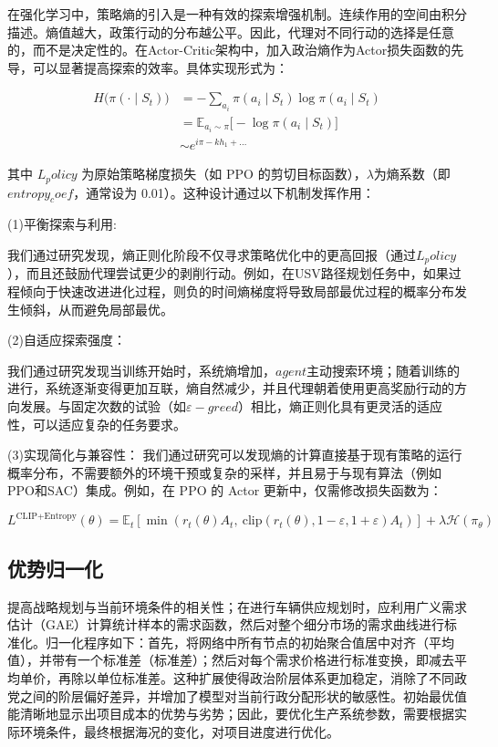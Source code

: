 在强化学习中，策略熵的引入是一种有效的探索增强机制。连续作用的空间由积分描述。熵值越大，政策行动的分布越公平。因此，代理对不同行动的选择是任意的，而不是决定性的。在Actor-Critic架构中，加入政治熵作为Actor损失函数的先导，可以显著提高探索的效率。具体实现形式为：

\begin{align}
	H\big(\pi(\cdot \mid S_t)\big) &= -\sum_{a_i} \pi(a_i \mid S_t) \log \pi(a_i \mid S_t) \\
	&= \mathbb{E}_{a_i \sim \pi} \Big[ -\log \pi(a_i \mid S_t) \Big] \\
	&\sim e^{i\pi - k h_1 + \dots}
\end{align}

其中 \(L_policy\) 为原始策略梯度损失（如 PPO 的剪切目标函数），\(λ\)为熵系数（即 \(entropy_coef\)，通常设为 0.01）。这种设计通过以下机制发挥作用：

(1)平衡探索与利用:

我们通过研究发现，熵正则化阶段不仅寻求策略优化中的更高回报（通过\(L_policy\)），而且还鼓励代理尝试更少的剥削行动。例如，在USV路径规划任务中，如果过程倾向于快速改进进化过程，则负的时间熵梯度将导致局部最优过程的概率分布发生倾斜，从而避免局部最优。

(2)自适应探索强度：

我们通过研究发现当训练开始时，系统熵增加，\(agent\)主动搜索环境；随着训练的进行，系统逐渐变得更加互联，熵自然减少，并且代理朝着使用更高奖励行动的方向发展。与固定次数的试验（如\(ε-greed\)）相比，熵正则化具有更灵活的适应性，可以适应复杂的任务要求。

(3)实现简化与兼容性：
我们通过研究可以发现熵的计算直接基于现有策略的运行概率分布，不需要额外的环境干预或复杂的采样，并且易于与现有算法（例如PPO和SAC）集成。例如，在 PPO 的 Actor 更新中，仅需修改损失函数为：

\begin{equation}
	L^{\text{CLIP+Entropy}}(\theta) = \mathbb{E}_t \left[ \min\left( r_t(\theta) A_t, \ \text{clip}\left( r_t(\theta), 1-\varepsilon, 1+\varepsilon \right) A_t \right) \right] + \lambda \mathcal{H}(\pi_\theta)
\end{equation}

\subsection{优势归一化}

提高战略规划与当前环境条件的相关性；在进行车辆供应规划时，应利用广义需求估计（GAE）计算统计样本的需求函数，然后对整个细分市场的需求曲线进行标准化。归一化程序如下：首先，将网络中所有节点的初始聚合值居中对齐（平均值），并带有一个标准差（标准差）；然后对每个需求价格进行标准变换，即减去平均单价，再除以单位标准差。这种扩展使得政治阶层体系更加稳定，消除了不同政党之间的阶层偏好差异，并增加了模型对当前行政分配形状的敏感性。初始最优值能清晰地显示出项目成本的优势与劣势；因此，要优化生产系统参数，需要根据实际环境条件，最终根据海况的变化，对项目进度进行优化。

